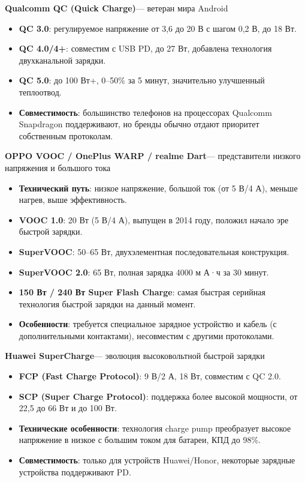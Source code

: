 \textbf{Qualcomm QC (Quick Charge)}— ветеран мира Android

\begin{itemize}
  \item \textbf{QC 3.0}: регулируемое напряжение от 3,6 до 20 В с шагом 0,2 В, до 18 Вт.
  \item \textbf{QC 4.0/4+}: совместим с USB PD, до 27 Вт, добавлена технология двухканальной зарядки.
  \item \textbf{QC 5.0}: до 100 Вт+, 0–50\% за 5 минут, значительно улучшенный теплоотвод.
  \item \textbf{Совместимость}: большинство телефонов на процессорах Qualcomm Snapdragon поддерживают, но бренды обычно отдают приоритет собственным протоколам.
\end{itemize}

\textbf{OPPO VOOC / OnePlus WARP / realme Dart}— представители низкого напряжения и большого тока

\begin{itemize}
  \item \textbf{Технический путь}: низкое напряжение, большой ток (от 5 В/4 А), меньше нагрев, выше эффективность.
  \item \textbf{VOOC 1.0}: 20 Вт (5 В/4 А), выпущен в 2014 году, положил начало эре быстрой зарядки.
  \item \textbf{SuperVOOC}: 50–65 Вт, двухэлементная последовательная конструкция.
  \item \textbf{SuperVOOC 2.0}: 65 Вт, полная зарядка 4000 м А·ч за 30 минут.
  \item \textbf{150 Вт / 240 Вт Super Flash Charge}: самая быстрая серийная технология быстрой зарядки на данный момент.
  \item \textbf{Особенности}: требуется специальное зарядное устройство и кабель (с дополнительными контактами), несовместим с другими протоколами.
\end{itemize}

\textbf{Huawei SuperCharge}— эволюция высоковольтной быстрой зарядки

\begin{itemize}
  \item \textbf{FCP (Fast Charge Protocol)}: 9 В/2 А, 18 Вт, совместим с QC 2.0.
  \item \textbf{SCP (Super Charge Protocol)}: поддержка более высокой мощности, от 22,5 до 66 Вт и до 100 Вт.
  \item \textbf{Технические особенности}: технология charge pump преобразует высокое напряжение в низкое с большим током для батареи, КПД до 98\%.
  \item \textbf{Совместимость}: только для устройств Huawei/Honor, некоторые зарядные устройства поддерживают PD.
\end{itemize}

